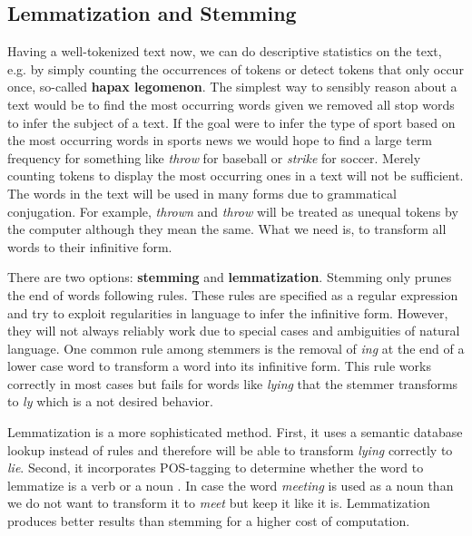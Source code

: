 \subsection{Lemmatization and Stemming}\label{stemming}
Having a well-tokenized text now, we can do descriptive statistics on the text, e.g. by simply counting the occurrences of tokens or detect tokens that only occur once, so-called \textbf{hapax legomenon}.
The simplest way to sensibly reason about a text would be to find the most occurring words given we removed all stop words to infer the subject of a text.
If the goal were to infer the type of sport based on the most occurring words in sports news we would hope to find a large term frequency for something like \textit{throw} for baseball or \textit{strike} for soccer.
Merely counting tokens to display the most occurring ones in a text will not be sufficient.
The words in the text will be used in many forms due to grammatical conjugation.
For example, \textit{thrown} and \textit{throw} will be treated as unequal tokens by the computer although they mean the same.
What we need is, to transform all words to their infinitive form.

There are two options: \textbf{stemming} and \textbf{lemmatization}.
Stemming only prunes the end of words following rules.
These rules are specified as a regular expression and try to exploit regularities in language to infer the infinitive form.
However, they will not always reliably work due to special cases and ambiguities of natural language.
One common rule among stemmers is the removal of \textit{ing} at the end of a lower case word to transform a word into its infinitive form. This rule works correctly in most cases but fails for words like \textit{lying} that the stemmer transforms to \textit{ly} which is a not desired behavior.

Lemmatization is a more sophisticated method.
First, it uses a semantic database lookup instead of rules and therefore will be able to transform \textit{lying} correctly to \textit{lie}.
Second, it incorporates POS-tagging to determine whether the word to lemmatize is a verb or a noun \citep{Muller2015}.
In case the word \textit{meeting} is used as a noun than we do not want to transform it to \textit{meet} but keep it like it is. Lemmatization produces better results than stemming \citep{Balakrishnan2014}  for a higher cost of computation.



